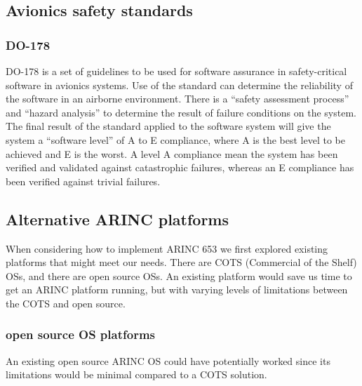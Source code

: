 \subsection{Avionics safety standards}

\subsubsection{DO-178}
DO-178 is a set of guidelines to be used for software assurance in safety-critical software in avionics systems.
Use of the standard can determine the reliability of the software in an airborne environment.
There is a ``safety assessment process'' and ``hazard analysis'' to determine the result of failure conditions on the system.
The final result of the standard applied to the software system will give the system a ``software level'' of A to E compliance,
where A is the best level to be achieved and E is the worst.
A level A compliance mean the system has been verified and validated against catastrophic failures,
whereas an E compliance has been verified against trivial failures.

\subsection{Alternative ARINC platforms}
When considering how to implement ARINC 653 we first explored existing platforms that might meet our needs.
There are COTS (Commercial of the Shelf) OSs, and there are open source OSs.
An existing platform would save us time to get an ARINC platform running,
but with varying levels of limitations between the COTS and open source.

\subsubsection{open source OS platforms}
An existing open source ARINC OS could have potentially worked since its limitations would be minimal
compared to a COTS solution. %

